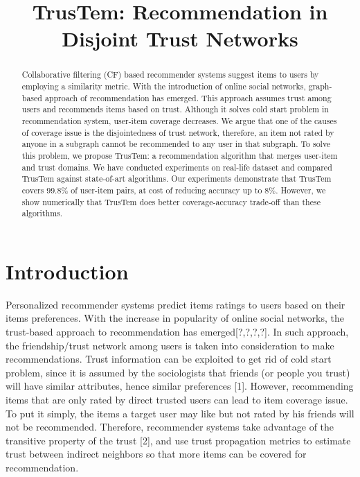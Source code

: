 \documentclass[11pt, conference, onecolumn]{IEEEtran}
\begin{document}
\nocite{*}
\title{TrusTem: Recommendation in Disjoint Trust Networks}

\author{
\and
{}
}

\maketitle

\begin{abstract}
Collaborative filtering (CF) based recommender systems suggest items to users by employing a similarity metric. With the introduction of online social networks, graph-based approach of recommendation has emerged. This approach assumes trust among users and recommends items based on trust. Although it solves cold start problem in recommendation system, user-item coverage decreases. We argue that one of the causes of coverage issue is the disjointedness of trust network, therefore, an item not rated by anyone in a subgraph cannot be recommended to any user in that subgraph. To solve this problem, we propose TrusTem: a recommendation algorithm that merges user-item and trust domains. We have conducted experiments on real-life dataset and compared TrusTem against state-of-art algorithms. Our experiments demonstrate that TrusTem covers $99.8\%$ of user-item pairs, at cost of reducing accuracy up to $8\%$. However, we show numerically that TrusTem does better coverage-accuracy trade-off than these algorithms.
\end{abstract}

\section{Introduction} \label{sec:intro}
Personalized recommender systems predict items ratings to users based on their items preferences. With the increase in popularity of online social networks, the trust-based approach to recommendation has emerged[?,?,?,?]. In such approach, the friendship/trust network among users is taken into consideration to make recommendations. Trust information can be exploited to get rid of cold start problem, since it is assumed by the sociologists that friends (or people you trust) will have similar attributes, hence similar preferences [1]. However, recommending items that are only rated by direct trusted users can lead to item coverage issue. To put it simply, the items a target user may like but not rated by his friends will not be recommended. Therefore, recommender systems take advantage of the transitive property of the trust [2], and use trust propagation metrics to estimate trust between indirect neighbors so that more items can be covered for recommendation. 
\end{document}
